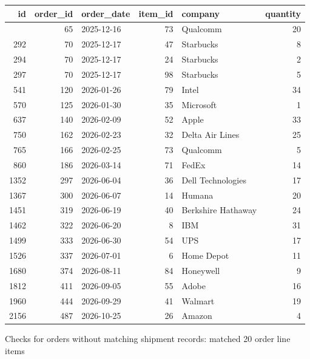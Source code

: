 \documentclass[
]{article}
\newenvironment{Shaded}{\begin{snugshade}}{\end{snugshade}}
\newcommand{\FunctionTok}[1]{\textcolor[rgb]{0.13,0.29,0.53}{\textbf{#1}}}
\newcommand{\NormalTok}[1]{#1}
\newcommand{\SpecialCharTok}[1]{\textcolor[rgb]{0.81,0.36,0.00}{\textbf{#1}}}
\newcounter{none} %
\begin{document}
{\def\LTcaptype{none} %
\begin{longtable}[]{@{}rrlrlr@{}}
\toprule\noalign{}
id & order\_id & order\_date & item\_id & company & quantity \\
\midrule\noalign{}
\endhead
\bottomrule\noalign{}
\endlastfoot
275 & 65 & 2025-12-16 & 73 & Qualcomm & 20 \\
292 & 70 & 2025-12-17 & 47 & Starbucks & 8 \\
294 & 70 & 2025-12-17 & 24 & Starbucks & 2 \\
297 & 70 & 2025-12-17 & 98 & Starbucks & 5 \\
541 & 120 & 2026-01-26 & 79 & Intel & 34 \\
570 & 125 & 2026-01-30 & 35 & Microsoft & 1 \\
637 & 140 & 2026-02-09 & 52 & Apple & 33 \\
750 & 162 & 2026-02-23 & 32 & Delta Air Lines & 25 \\
765 & 166 & 2026-02-25 & 73 & Qualcomm & 5 \\
860 & 186 & 2026-03-14 & 71 & FedEx & 14 \\
1352 & 297 & 2026-06-04 & 36 & Dell Technologies & 17 \\
1367 & 300 & 2026-06-07 & 14 & Humana & 20 \\
1451 & 319 & 2026-06-19 & 40 & Berkshire Hathaway & 24 \\
1462 & 322 & 2026-06-20 & 8 & IBM & 31 \\
1499 & 333 & 2026-06-30 & 54 & UPS & 17 \\
1526 & 337 & 2026-07-01 & 6 & Home Depot & 11 \\
1680 & 374 & 2026-08-11 & 84 & Honeywell & 9 \\
1812 & 411 & 2026-09-05 & 55 & Adobe & 16 \\
1960 & 444 & 2026-09-29 & 41 & Walmart & 19 \\
2156 & 487 & 2026-10-25 & 26 & Amazon & 4 \\
\end{longtable}
}

Checks for orders without matching shipment records: matched 20 order
line items

\begin{Shaded}
\end{Shaded}
\end{document}
